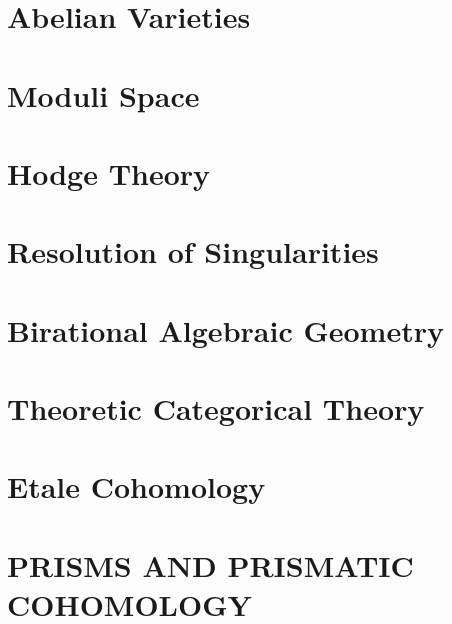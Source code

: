 \documentclass{ModulEN}
\begin{document}
	\part{Abelian Varieties}
		
			
		
	\part{Moduli Space}
	\part{Hodge Theory}
	\part{Resolution of Singularities}
	
		
	
	\part{Birational Algebraic Geometry}
	\part{Theoretic Categorical Theory}
	\part{Etale Cohomology}
	\part{PRISMS AND PRISMATIC COHOMOLOGY}
	
	
\end{document}
